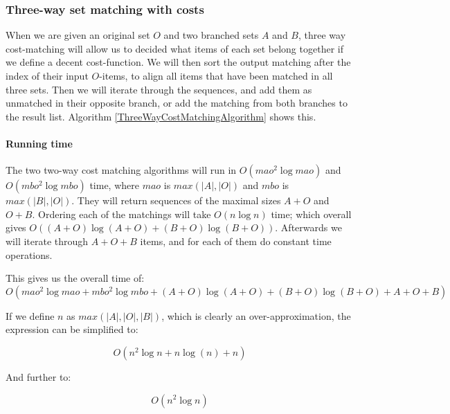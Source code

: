 \documentclass[11pt]{article}
\begin{document}
\subsubsection{Three-way set matching with costs}
When we are given an original set $O$ and two branched sets $A$ and $B$, three way cost-matching will allow us to decided what items of each set belong together if we define a decent cost-function. We will then sort the output matching after the index of their input $O$-items, to align all items that have been matched in all three sets. Then we will iterate through the sequences, and add them as unmatched in their opposite branch, or add the matching from both branches to the result list. Algorithm \ref{ThreeWayCostMatchingAlgorithm} shows this.

\paragraph{Running time} The two two-way cost matching algorithms will run in $O(mao^2 \log mao)$ and $O(mbo^2 \log mbo)$ time, where $mao$ is $max(|A|, |O|)$ and $mbo$ is $max(|B|, |O|)$. They will return sequences of the maximal sizes $A+O$ and $O+B$. Ordering each of the matchings will take $O(n \log n)$ time; which overall gives $O((A+O) \log (A+O) + (B+O) \log (B+O))$. Afterwards we will iterate through $A+O+B$ items, and for each of them do constant time operations.

This gives us the overall time of:
\begin{equation}
O(mao^2 \log mao + mbo^2 \log mbo + (A+O) \log (A+O) + (B+O) \log (B+O) + A + O + B) \nonumber
\end{equation}

If we define $n$ as $max(|A|, |O|, |B|)$, which is clearly an over-approximation, the expression can be simplified to:

\begin{equation}
O(n^2 \log n + n \log (n) + n) \nonumber
\end{equation}

And further to:

\begin{equation}
O(n^2 \log n) \nonumber
\end{equation}
\end{document}
